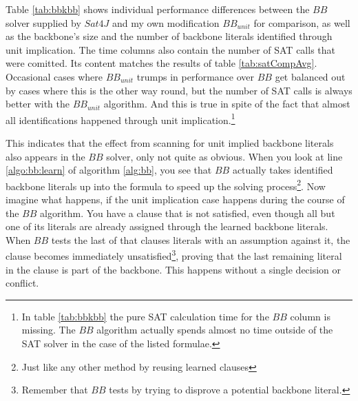 Table \ref{tab:bbkbb} shows individual performance differences between the $BB$ solver supplied by $Sat4J$ and my own modification $BB_{unit}$ for comparison, as well as the backbone's size and the number of backbone literals identified through unit implication. The time columns also contain the number of SAT calls that were comitted. Its content matches the results of table \ref{tab:satCompAvg}. Occasional cases where $BB_{unit}$ trumps in performance over $BB$ get balanced out by cases where this is the other way round, but the number of SAT calls is always better with the $BB_{unit}$ algorithm. And this is true in spite of the fact that almost all identifications happened through unit implication.\footnote{
	In table \ref{tab:bbkbb} the pure SAT calculation time for the $BB$ column is missing. The $BB$ algorithm actually spends almost no time outside of the SAT solver in the case of the listed formulae.
}

This indicates that the effect from scanning for unit implied backbone literals also appears in the $BB$ solver, only not quite as obvious. When you look at line \ref{algo:bb:learn} of algorithm \ref{alg:bb}, you see that $BB$ actually takes identified backbone literals up into the formula to speed up the solving process\footnote{Just like any other method by reusing learned clauses}. Now imagine what happens, if the unit implication case happens during the course of the $BB$ algorithm. You have a clause that is not satisfied, even though all but one of its literals are already assigned through the learned backbone literals. When $BB$ tests the last of that clauses literals with an assumption against it, the clause becomes immediately unsatisfied\footnote{Remember that $BB$ tests by trying to disprove a potential backbone literal.}, proving that the last remaining literal in the clause is part of the backbone. This happens without a single decision or conflict. 

